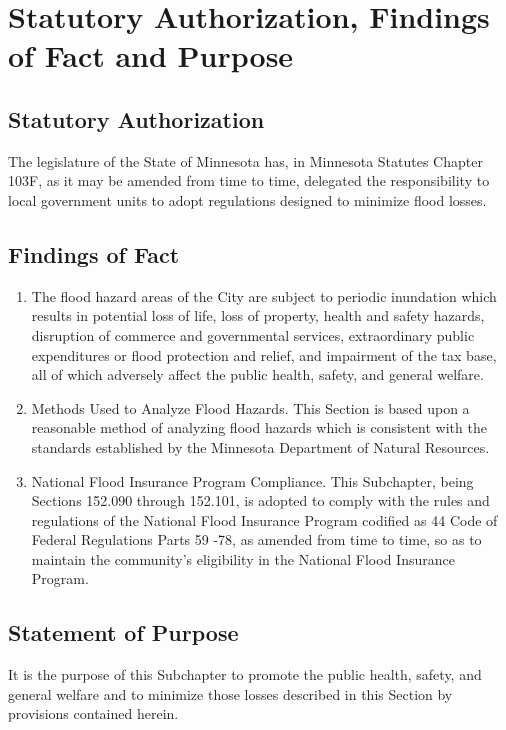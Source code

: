 
\setcounter{section}{89}
\section{Statutory Authorization, Findings of Fact and Purpose}
\subsection{Statutory Authorization}
The legislature of the State of Minnesota has, in Minnesota Statutes Chapter 103F, as it may be amended from time to time, delegated the responsibility to local government units to adopt regulations designed to minimize flood losses.
\subsection{Findings of Fact}
\begin{enumerate}[{\indent}1)]
    \item The flood hazard areas of the City are subject to periodic inundation which results in potential loss of life, loss of property, health and safety hazards, disruption of commerce and governmental services, extraordinary public expenditures or flood protection and relief, and impairment of the tax base, all of which adversely affect the public health, safety, and general welfare.
    \item Methods Used to Analyze Flood Hazards. This Section is based upon a reasonable method of analyzing flood hazards which is consistent with the standards established by the Minnesota Department of Natural Resources.
    \item National Flood Insurance Program Compliance. This Subchapter, being Sections 152.090 through 152.101, is adopted to comply with the rules and regulations of the National Flood Insurance Program codified as 44 Code of Federal Regulations Parts 59 -78, as amended from time to time, so as to maintain the community’s eligibility in the National Flood Insurance Program.
\end{enumerate}
\subsection{Statement of Purpose}
It is the purpose of this Subchapter to promote the public health, safety, and general welfare and to minimize those losses described in this Section by provisions contained herein.\\

